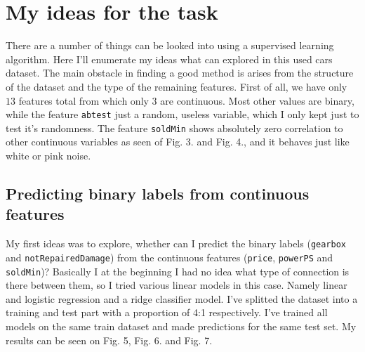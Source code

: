 \section{My ideas for the task}
There are a number of things can be looked into using a supervised learning algorithm. Here I'll enumerate my ideas what can explored in this used cars dataset. The main obstacle in finding a good method is arises from the structure of the dataset and the type of the remaining features. First of all, we have only $13$ features total from which only $3$ are continuous. Most other values are binary, while the feature \texttt{abtest} just a random, useless variable, which I only kept just to test it's randomness. The feature \texttt{soldMin} shows absolutely zero correlation to other continuous variables as seen of Fig. 3. and Fig. 4., and it behaves just like white or pink noise.

\subsection{Predicting binary labels from continuous features}
My first ideas was to explore, whether can I predict the binary labels (\texttt{gearbox} and \texttt{notRepairedDamage}) from the continuous features (\texttt{price}, \texttt{powerPS} and \texttt{soldMin})? Basically I at the beginning I had no idea what type of connection is there between them, so I tried various linear models in this case. Namely linear and logistic regression and a ridge classifier model. I've splitted the dataset into a training and test part with a proportion of 4:1 respectively. I've trained all models on the same train dataset and made predictions for the same test set. My results can be seen on Fig. 5, Fig. 6. and Fig. 7.

